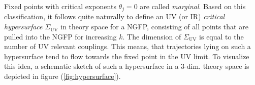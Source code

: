 Fixed points with critical exponents $\theta_{j}=0$ are called \textit{marginal}. Based on this classification, it follows quite naturally to define an UV (or IR)  \textit{critical hypersurface} $\Sigma_{\mathrm{UV}}$ in theory space for a NGFP, consisting of all points that are pulled into the NGFP for increasing $k$. The dimension of $\Sigma_{\mathrm{UV}}$ is equal to the number of UV relevant couplings. This means, that trajectories lying on such a hypersurface tend to flow towards the fixed point in the UV limit. To visualize this idea, a schematic sketch of such a hypersurface in a $3$-dim. theory space is depicted in figure (\ref{fig:hypersurface}).